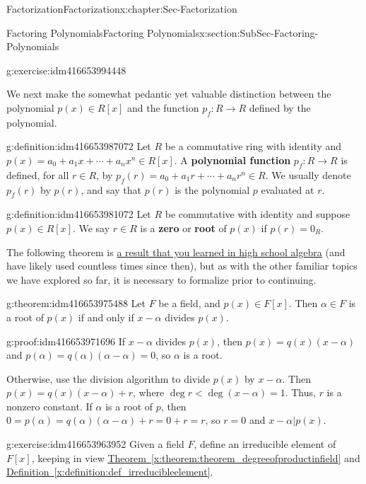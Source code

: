 \documentclass[oneside,10pt,]{book}
\newcommand{\terminology}[1]{\textbf{#1}}
\numberwithin{equation}{section}
\newcommand{\lt}{<}
\begin{document}
\begin{chapterptx}{Factorization}{}{Factorization}{}{}{x:chapter:Sec-Factorization}
\begin{sectionptx}{Factoring Polynomials}{}{Factoring Polynomials}{}{}{x:section:SubSec-Factoring-Polynomials}
\begin{inlineexercise}{}{g:exercise:idm416653994448}
\end{inlineexercise}
We next make the somewhat pedantic \textemdash{} yet valuable \textemdash{} distinction between the polynomial \(p(x)\in R[x]\) and the function \(p_f : R\to R\) defined by the polynomial.%
\begin{definition}{}{g:definition:idm416653987072}%
Let \(R\) be a commutative ring with identity and \(p(x) = a_0 + a_1 x + \cdots + a_n x^n \in R[x]\). A \terminology{polynomial function} \(p_f : R \to R\) is defined, for all \(r\in R\), by \(p_f(r) = a_0 + a_1 r + \cdots + a_n r^n \in R\). We usually denote \(p_f(r)\) by \(p(r)\), and say that \(p(r)\) is the polynomial \(p\) evaluated at \(r\).%
\end{definition}
\begin{definition}{}{g:definition:idm416653981072}%
Let \(R\) be commutative with identity and suppose \(p(x) \in R[x]\). We say \(r\in R\) is a \terminology{zero} or \terminology{root} of \(p(x)\) if \(p(r) = 0_R\).%
\end{definition}
The following theorem is \href{http://www.corestandards.org/Math/Content/HSA/APR/B/2/}{a result that you learned in high school algebra} (and have likely used countless times since then), but as with the other familiar topics we have explored so far, it is necessary to formalize prior to continuing.%
\begin{theorem}{}{}{g:theorem:idm416653975488}%
Let \(F\) be a field, and \(p(x)\in F[x]\). Then \(\alpha\in F\) is a root of \(p(x)\) if and only if \(x-\alpha\) divides \(p(x)\).%
\end{theorem}
\begin{proofptx}{}{g:proof:idm416653971696}
If \(x-\alpha\) divides \(p(x)\), then \(p(x) = q(x) (x-\alpha)\) and \(p(\alpha) = q(\alpha) (\alpha - \alpha) = 0\), so \(\alpha\) is a root.%
\par
Otherwise, use the division algorithm to divide \(p(x)\) by \(x-\alpha\). Then \(p(x) = q(x)(x-\alpha) + r\), where \(\deg r \lt \deg (x-\alpha) = 1\). Thus, \(r\) is a nonzero constant. If \(\alpha\) is a root of \(p\), then \(0 = p(\alpha) = q(\alpha) (\alpha - \alpha) + r = 0 + r = r\), so \(r=0\) and \(x-\alpha | p(x)\).%
\end{proofptx}
\begin{inlineexercise}{}{g:exercise:idm416653963952}%
Given a field \(F\), define an irreducible element of \(F[x]\), keeping in view \hyperref[x:theorem:theorem_degreeofproductinfield]{Theorem~\ref{x:theorem:theorem_degreeofproductinfield}} and \hyperref[x:definition:def_irreducibleelement]{Definition~\ref{x:definition:def_irreducibleelement}}.%

\end{inlineexercise}
\end{sectionptx}
\end{chapterptx}
\end{document}
